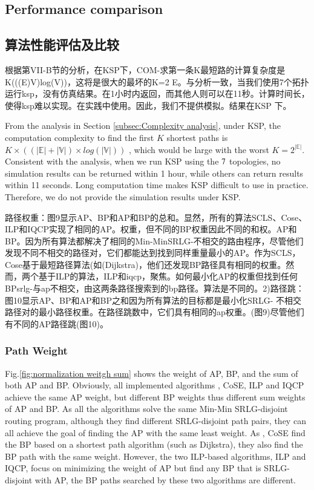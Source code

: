 \subsection{Performance comparison}



\subsection{算法性能评估及比较}
根据第VII-B节的分析，在KSP下，COM-求第一条K最短路的计算复杂度是K(((E)V)log(V))，这将是很大的最坏的K=2 E。与分析一致，当我们使用7个拓扑运行ksp，没有仿真结果。在1小时内返回，而其他人则可以在11秒。计算时间长，使得ksp难以实现。在实践中使用。因此，我们不提供模拟。结果在KSP 下。


From the analysis in Section \ref{subsec:Complexity analysis}, under KSP, the computation complexity to find the first $K$ shortest paths is $K\times ((|\mathbb{E}|+|\mathbb{V}|)\times log(|\mathbb{V}|))$ , which would be large with the worst $K=2^{|\mathbb{E}|}$.
 Consistent with the analysis, when we run KSP using the $7$ topologies, no simulation results can be returned within 1 hour, while others can return results within 11 seconds. Long computation time makes KSP difficult to use in practice. Therefore, we do not provide the simulation results under KSP.

路径权重：图9显示AP、BP和AP和BP的总和。显然，所有的算法SCLS、Cose、ILP和IQCP实现了相同的AP。权重，但不同的BP权重因此不同的和权。AP和BP。因为所有算法都解决了相同的Min-MinSRLG-不相交的路由程序，尽管他们发现不同不相交的路径对，它们都能达到找到同样重量最小的AP。作为SCLS，Cose基于最短路径算法(如(Dijkstra)，他们还发现BP路径具有相同的权重。然而，两个基于ILP的算法，ILP和iqcp，聚焦。如何最小化AP的权重但找到任何BPsrlg-与ap不相交，由这两条路径搜索到的bp路径。算法是不同的。2)路径跳：图10显示AP、BP和AP和BP之和因为所有算法的目标都是最小化SRLG- 不相交路径对的最小路径权重。在路径跳数中，它们具有相同的ap权重。(图9)尽管他们有不同的AP路径跳(图10)。

\subsubsection{Path Weight}
Fig.\ref{fig:normalization weitgh sum} shows the weight of AP, BP, and the sum of both AP and BP. Obviously, all implemented algorithms \CI, CoSE, ILP and IQCP achieve the same AP weight, but different BP weights thus different sum weights of AP and BP. As all the algorithms solve the same Min-Min SRLG-disjoint routing program, although they find different SRLG-disjoint path pairs, they can all achieve the goal of finding the  AP with the same least weight.
As \CI, CoSE find the  BP based on a shortest path algorithm (such as Dijkstra), they also find the BP path with the same weight. However, the two ILP-based algorithms, ILP and IQCP, focus on minimizing the weight of AP but find any BP that is SRLG-disjoint with AP, the BP paths searched by these two algorithms are different.

